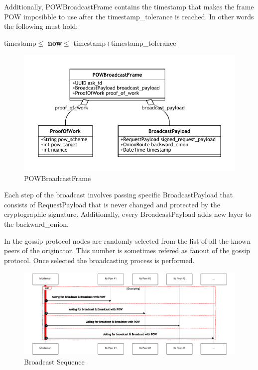 \documentclass{article}
\begin{document}
Additionally, POWBroadcastFrame contains the timestamp that makes the frame POW imposibble to use after the timestamp\_tolerance is reached. In other words the following must hold:

\begin{center}
	timestamp$\le$ \textbf{now}$\le$ timestamp+timestamp\_tolerance
\end{center}

\begin{figure}
	\centering
	\includegraphics[scale=1.0]{POWBroadcastFrame.pdf}
	\caption{POWBroadcastFrame}
	\label{fig:fr:powbroadcastframe}
\end{figure}


Each step of the broadcast involves passing specific BroadcastPayload that consists of RequestPayload that is never changed and protected by the cryptographic signature.  Additionally, every BroadcastPayload adds new layer to the backward\_onion.

In the gossip protocol nodes are randomly selected from the list of all the known peers of the originator. This number is sometimes refered as fanout \cite{Fanout} of the gossip protocol. Once selected the broadcasting process is performed.

\begin{figure}
	\centering
	\includegraphics[scale=0.5]{BroadcastSequence.pdf}
	\caption{Broadcast Sequence}
	\label{fig:fr:broadcastsequence}
\end{figure}
\end{document}
